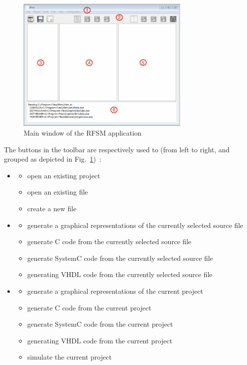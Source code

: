 \begin{figure}[h]
  \centering
  \includegraphics[width=0.75\textwidth]{figs/gui/mainwindow}
  \caption{Main window of the RFSM application}
  \label{fig:main-window}
\end{figure}

The buttons in the toolbar are respectively used to (from left to right, and grouped as depicted in
Fig.~\ref{fig:main-window})~:
\begin{itemize}
\item 
  \begin{itemize}
  \item open an existing project
  \item open an existing file
  \item create a new file
  \end{itemize}
\item 
  \begin{itemize}
  \item generate a graphical representations of the currently selected source file
  \item generate C code from the currently selected source file
  \item generate SystemC code from the currently selected source file
  \item generating VHDL code from the  currently selected source file
  \end{itemize}
\item 
  \begin{itemize}
  \item generate a graphical representations of the current project
  \item generate C code from the current project
  \item generate SystemC code from the current project
  \item generating VHDL code from the current project
  \item simulate the current project
  \end{itemize}
\end{itemize}

